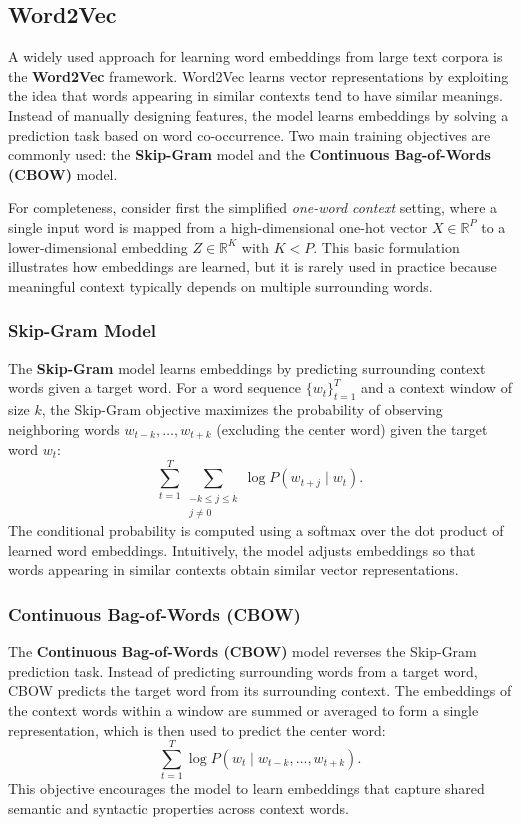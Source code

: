 \documentclass{article}
\begin{document}
\subsection{Word2Vec}

A widely used approach for learning word embeddings from large text corpora is the \textbf{Word2Vec} framework. Word2Vec learns vector representations by exploiting the idea that words appearing in similar contexts tend to have similar meanings. Instead of manually designing features, the model learns embeddings by solving a prediction task based on word co-occurrence. Two main training objectives are commonly used: the \textbf{Skip-Gram} model and the \textbf{Continuous Bag-of-Words (CBOW)} model.

For completeness, consider first the simplified \emph{one-word context} setting, where a single input word is mapped from a high-dimensional one-hot vector \(X \in \mathbb{R}^P\) to a lower-dimensional embedding \(Z \in \mathbb{R}^K\) with \(K < P\). This basic formulation illustrates how embeddings are learned, but it is rarely used in practice because meaningful context typically depends on multiple surrounding words.

\subsubsection*{Skip-Gram Model}

The \textbf{Skip-Gram} model learns embeddings by predicting surrounding context words given a target word. For a word sequence \(\{w_t\}_{t=1}^T\) and a context window of size \(k\), the Skip-Gram objective maximizes the probability of observing neighboring words \(w_{t-k}, \ldots, w_{t+k}\) (excluding the center word) given the target word \(w_t\):
\[
\sum_{t=1}^{T} \sum_{\substack{-k \le j \le k \\ j \neq 0}} 
\log P(w_{t+j}\mid w_t).
\]
The conditional probability is computed using a softmax over the dot product of learned word embeddings. Intuitively, the model adjusts embeddings so that words appearing in similar contexts obtain similar vector representations.

\subsubsection*{Continuous Bag-of-Words (CBOW)}

The \textbf{Continuous Bag-of-Words (CBOW)} model reverses the Skip-Gram prediction task. Instead of predicting surrounding words from a target word, CBOW predicts the target word from its surrounding context. The embeddings of the context words within a window are summed or averaged to form a single representation, which is then used to predict the center word:
\[
\sum_{t=1}^{T} \log P(w_t \mid w_{t-k}, \ldots, w_{t+k}).
\]
This objective encourages the model to learn embeddings that capture shared semantic and syntactic properties across context words.
\end{document}
